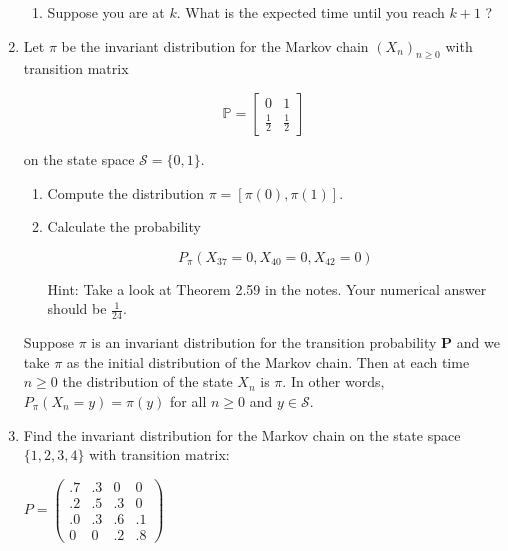 \documentclass{article} %
\theoremstyle{plain}
\theoremstyle{case}
\begin{document}
\begin{enumerate}[label={\fbox{\textbf{Exercise \#\arabic* :}}}]
\begin{enumerate}
  \item  Suppose you are at $k$. What is the expected time until you reach $k+1$ ?
\end{enumerate}

\newpage
  \item Let $\pi$ be the invariant distribution for the Markov chain $\left(X_{n}\right)_{n \geq 0}$ with transition matrix

$$
\mathbb{P}=\left[\begin{array}{ll}
0 & 1 \\
\frac{1}{2} & \frac{1}{2}
\end{array}\right]
$$

on the state space $\mathcal{S}=\{0,1\}$.

\begin{enumerate}
  \item  Compute the distribution $\pi=[\pi(0), \pi(1)]$.

  \item  Calculate the probability

$$
P_{\pi}\left(X_{37}=0, X_{40}=0, X_{42}=0\right)
$$

Hint: Take a look at Theorem 2.59 in the notes. Your numerical answer should be $\frac{1}{24}$.
\end{enumerate}
   {
    Suppose $\pi$ is an invariant distribution for the transition probability $\mathbf{P}$ and we take $\pi$ as the initial distribution of the Markov chain. Then at each time $n \geq 0$ the distribution of the state $X_n$ is $\pi$. In other words, $P_\pi\left(X_n=y\right)=\pi(y)$ for all $n \geq 0$ and $y \in \mathcal{S}$.
  }

\newpage
  \item Find the invariant distribution for the Markov chain on the state space $\{1,2,3,4\}$ with transition matrix:

$P=\left(\begin{array}{llll}.7 & .3 & 0 & 0 \\ .2 & .5 & .3 & 0 \\ .0 & .3 & .6 & .1 \\ 0 & 0 & .2 & .8\end{array}\right)$



\end{enumerate}

%
%
\end{document}
